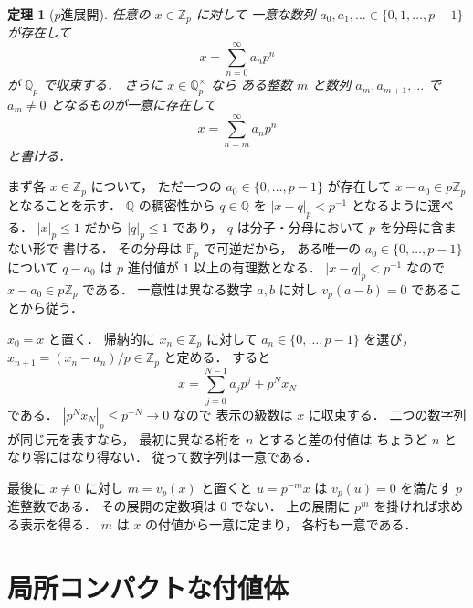 \documentclass[a5paper,10pt,onecolumn]{jsarticle}
\makeatletter
\theoremstyle{mathnotetheorem}
\newtheorem{theorem}{定理}[section]
\renewcommand{\proofname}{証明}
\renewenvironment{proof}[1][\proofname]{%
  \par\pushQED{\qed}\normalfont\topsep4\p@\@plus2\p@\relax
  \trivlist\item[\hskip\labelsep\bfseries #1]\ignorespaces
}{\popQED\endtrivlist\@endpefalse}
\makeatother
\begin{document}
\begin{theorem}[$p$進展開]\label{thm:padic-expansion}
任意の $x\in\mathbb Z_p$ に対して
一意な数列
$a_0,a_1,\dots\in\{0,1,\dots,p-1\}$ が存在して
\[
 x=\sum_{n=0}^\infty a_np^n
\]
が $\mathbb Q_p$ で収束する．
さらに $x\in\mathbb Q_p^\times$ なら
ある整数 $m$ と数列 $a_m,a_{m+1},\dots$ で
$a_m\ne0$ となるものが一意に存在して
\[
 x=\sum_{n=m}^\infty a_np^n
\]
と書ける．
\end{theorem}
\begin{proof}
まず各 $x\in\mathbb Z_p$ について，
ただ一つの $a_0\in\{0,\dots,p-1\}$ が存在して
$x-a_0\in p\mathbb Z_p$ となることを示す．
$\mathbb Q$ の稠密性から
$q\in\mathbb Q$ を $|x-q|_p<p^{-1}$ となるように選べる．
$|x|_p\le1$ だから $|q|_p\le1$ であり，
$q$ は分子・分母において $p$ を分母に含まない形で
書ける．
その分母は $\mathbb F_p$ で可逆だから，
ある唯一の $a_0\in\{0,\dots,p-1\}$ について
$q-a_0$ は $p$ 進付値が $1$ 以上の有理数となる．
$|x-q|_p<p^{-1}$ なので $x-a_0\in p\mathbb Z_p$ である．
一意性は異なる数字 $a,b$ に対し
$v_p(a-b)=0$ であることから従う．

$x_0=x$ と置く．
帰納的に $x_n\in\mathbb Z_p$ に対して
$a_n\in\{0,\dots,p-1\}$ を選び，
$x_{n+1}=(x_n-a_n)/p\in\mathbb Z_p$ と定める．
すると
\[
 x=\sum_{j=0}^{N-1}a_jp^j+p^Nx_N
\]
である．
$|p^Nx_N|_p\le p^{-N}\to0$ なので
表示の級数は $x$ に収束する．
二つの数字列が同じ元を表すなら，
最初に異なる桁を $n$ とすると差の付値は
ちょうど $n$ となり零にはなり得ない．
従って数字列は一意である．

最後に $x\ne0$ に対し
$m=v_p(x)$ と置くと
$u=p^{-m}x$ は $v_p(u)=0$ を満たす
$p$ 進整数である．
その展開の定数項は $0$ でない．
上の展開に $p^m$ を掛ければ求める表示を得る．
$m$ は $x$ の付値から一意に定まり，
各桁も一意である．
\end{proof}

\section{局所コンパクトな付値体}
\end{document}
